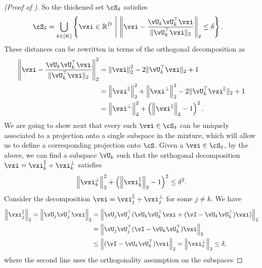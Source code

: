 \documentclass[../../book-main.tex]{subfiles}
\begin{document}
\begin{proof}[(Proof of )]
    So the thickened set $\cS_{\delta}$ satisfies
    \begin{align}
        \cS_{\delta} 
        &= \bigcup_{k \in [K]} \set*{\vxi \in \R^D \given 
        \norm*{\vxi - \frac{\vU_k\vU_k^\top \vxi}{\norm{\vU_k^\top \vxi}_2}}_2
        \leq \delta}.
    \end{align}
    These distances can be rewritten in terms of the orthogonal decomposition as 
    \begin{align}
        \norm*{\vxi - \frac{\vU_k\vU_k^\top \vxi}{\norm{\vU_k^\top \vxi}_2}}_2^2
        &=
        \norm*{\vxi}_2^2 - 2 \norm{\vU_k^\top \vxi}_2 + 1
        \\
        &=
        \norm*{\vxi^{\|}}_2^2 
        + \norm*{\vxi^{\perp}}_2^2
        - 2 \norm{\vU_k^\top \vxi^{\|}}_2 + 1
        \\
        &=
        \norm*{\vxi^{\perp}}_2^2
        + \left( \norm*{\vxi^{\|}}_2 - 1 \right)^2.
        \label{eq:distance-to-hypersphere}
    \end{align}
    We are going to show next that every such $\vxi \in \cS_{\delta}$ can be
    uniquely associated to a projection onto a single subspace in the mixture,
    which will allow us to define a corresponding projection onto $\cS$.
    Given a $\vxi \in \cS_{\delta}$, by the above, we can find a subspace
    $\vU_k$ such that the orthogonal decomposition $\vxi = \vxi^{\|}_k
    + \vxi^{\perp}_k$ satisfies
    \begin{equation}
        \norm*{\vxi^{\perp}_k}_2^2
        + \left( \norm*{\vxi^{\|}_k}_2 - 1 \right)^2
        \leq
        \delta^2.
    \end{equation}
    Consider the decomposition $\vxi = \vxi_j^{\|} + \vxi_j^{\perp}$ for some $j
    \neq k$. We have
    \begin{align}
        \norm*{\vxi_j^{\|}}_2
        =
        \norm*{
            \vU_j \vU_j^\top \vxi 
        }_2
        &=
        \norm*{
            \vU_j \vU_j^\top( \vU_k \vU_k^\top \vxi + (\vI - \vU_k \vU_k^\top)
            \vxi )
        }_2
        \\
        &=
        \norm*{
            \vU_j \vU_j^\top (\vI - \vU_k \vU_k^\top) \vxi
        }_2
        \\
        &\leq
        \norm*{
            (\vI - \vU_k \vU_k^\top) \vxi
        }_2
        =
        \norm*{
            \vxi_k^{\perp}
        }_2
        \leq \delta,
    \end{align}
    where the second line uses the orthogonality assumption on the subspaces

\end{proof}
\end{document}
